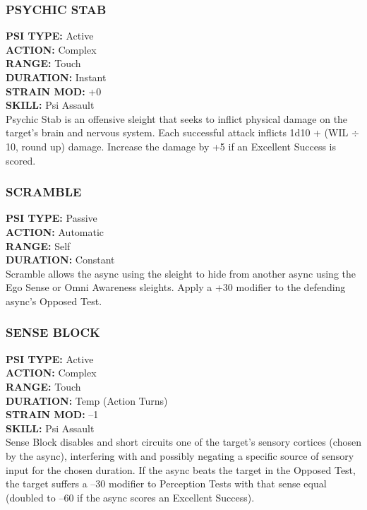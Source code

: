 \subsubsection{PSYCHIC STAB}
\textbf{PSI TYPE:} Active \\ 
\textbf{ACTION:} Complex \\ 
\textbf{RANGE:} Touch \\ 
\textbf{DURATION:} Instant \\
\textbf{STRAIN MOD:} +0 \\ 
\textbf{SKILL:} Psi Assault \\
Psychic Stab is an offensive sleight that seeks to inflict
physical damage on the target’s brain and nervous
system. Each successful attack inflicts 1d10 + (WIL $\div$
10, round up) damage. Increase the damage by +5 if
an Excellent Success is scored.

\subsubsection{SCRAMBLE}
\textbf{PSI TYPE:} Passive \\ 
\textbf{ACTION:} Automatic \\ 
\textbf{RANGE:} Self \\ 
\textbf{DURATION:} Constant \\
Scramble allows the async using the sleight to hide
from another async using the Ego Sense or Omni
Awareness sleights. Apply a +30 modifier to the defending
async’s Opposed Test.

\subsubsection{SENSE BLOCK}
\textbf{PSI TYPE:} Active \\ 
\textbf{ACTION:} Complex \\ 
\textbf{RANGE:} Touch \\ 
\textbf{DURATION:} Temp (Action Turns) \\
\textbf{STRAIN MOD:} –1 \\ 
\textbf{SKILL:} Psi Assault \\
Sense Block disables and short circuits one of the target’s
sensory cortices (chosen by the async), interfering
with and possibly negating a specific source of sensory
input for the chosen duration. If the async beats the
target in the Opposed Test, the target suffers a –30
modifier to Perception Tests with that sense equal (doubled
to –60 if the async scores an Excellent Success).


